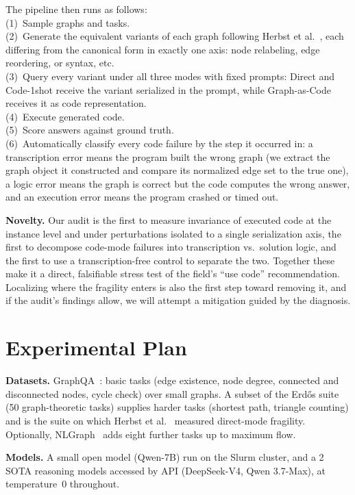 \documentclass[10pt,a4paper]{article}
\newcommand{\head}[1]{\vspace{0.35em}\noindent\textbf{#1}\hspace{0.5em}}
\begin{document}
The pipeline then runs as follows:\\
(1)~Sample graphs and tasks.\\
(2)~Generate the equivalent variants of each graph following Herbst et al.~\cite{herbst}, each differing from the canonical form in exactly one axis: node relabeling, edge reordering, or syntax, etc.\\
(3)~Query every variant under all three modes with fixed prompts: Direct and Code-1shot receive the variant serialized in the prompt, while Graph-as-Code receives it as code representation.\\
(4)~Execute generated code.\\
(5)~Score answers against ground truth.\\
(6)~Automatically classify every code failure by the step it occurred in: a transcription error means the program built the wrong graph (we extract the graph object it constructed and compare its normalized edge set to the true one), a logic error means the graph is correct but the code computes the wrong answer, and an execution error means the program crashed or timed out.

\head{Novelty.} Our audit is the first to measure invariance of executed code at the instance level and under perturbations isolated to a single serialization axis, the first to decompose code-mode failures into transcription vs.\ solution logic, and the first to use a transcription-free control to separate the two. Together these make it a direct, falsifiable stress test of the field's ``use code'' recommendation. Localizing where the fragility enters is also the first step toward removing it, and if the audit's findings allow, we will attempt a mitigation guided by the diagnosis.


\section{Experimental Plan}

\head{Datasets.} GraphQA~\cite{fatemi}: basic tasks (edge existence, node degree, connected and disconnected nodes, cycle check) over small graphs. A subset of the Erd\H{o}s suite~\cite{guo} (50 graph-theoretic tasks) supplies harder tasks (shortest path, triangle counting) and is the suite on which Herbst et al.~\cite{herbst} measured direct-mode fragility. Optionally, NLGraph~\cite{wang} adds eight further tasks up to maximum flow.

\head{Models.} A small open model (Qwen-7B) run on the Slurm cluster, and a 2 SOTA reasoning models accessed by API (DeepSeek-V4, Qwen 3.7-Max), at temperature~0 throughout.
\end{document}
